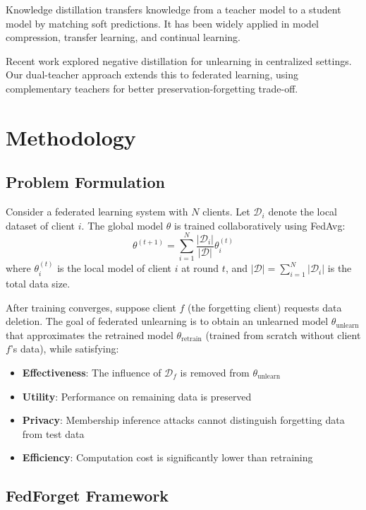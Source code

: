 \documentclass[11pt,a4paper]{article}
\begin{document}
Knowledge distillation transfers knowledge from a teacher model to a student model by matching soft predictions. It has been widely applied in model compression, transfer learning, and continual learning.

Recent work explored negative distillation for unlearning in centralized settings. Our dual-teacher approach extends this to federated learning, using complementary teachers for better preservation-forgetting trade-off.

\section{Methodology}

\subsection{Problem Formulation}

Consider a federated learning system with $N$ clients. Let $\mathcal{D}_i$ denote the local dataset of client $i$. The global model $\theta$ is trained collaboratively using FedAvg:
\begin{equation}
\theta^{(t+1)} = \sum_{i=1}^{N} \frac{|\mathcal{D}_i|}{|\mathcal{D}|} \theta_i^{(t)}
\end{equation}
where $\theta_i^{(t)}$ is the local model of client $i$ at round $t$, and $|\mathcal{D}| = \sum_{i=1}^{N} |\mathcal{D}_i|$ is the total data size.

After training converges, suppose client $f$ (the forgetting client) requests data deletion. The goal of federated unlearning is to obtain an unlearned model $\theta_{\text{unlearn}}$ that approximates the retrained model $\theta_{\text{retrain}}$ (trained from scratch without client $f$'s data), while satisfying:

\begin{itemize}
\item \textbf{Effectiveness}: The influence of $\mathcal{D}_f$ is removed from $\theta_{\text{unlearn}}$
\item \textbf{Utility}: Performance on remaining data is preserved
\item \textbf{Privacy}: Membership inference attacks cannot distinguish forgetting data from test data
\item \textbf{Efficiency}: Computation cost is significantly lower than retraining
\end{itemize}

\subsection{FedForget Framework}
\end{document}
